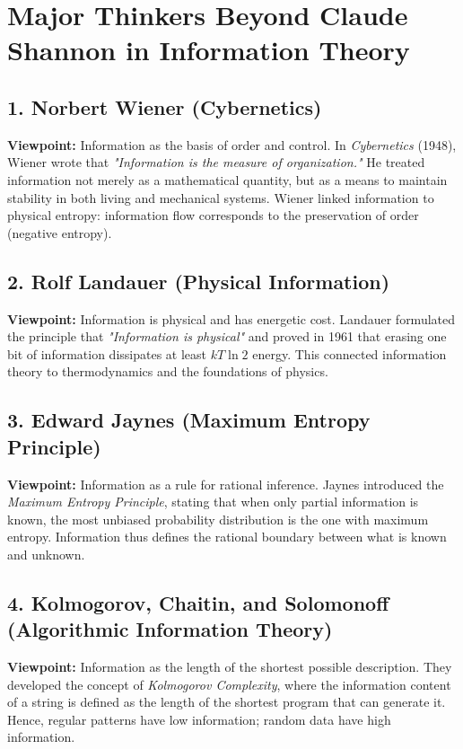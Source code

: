 \section*{Major Thinkers Beyond Claude Shannon in Information Theory}
    
    \subsection*{1. Norbert Wiener (Cybernetics)}
        \textbf{Viewpoint:} Information as the basis of order and control.
        In \textit{Cybernetics} (1948), Wiener wrote that
        \emph{"Information is the measure of organization."}
        He treated information not merely as a mathematical quantity, but as a means to maintain stability in both living and mechanical systems.
        Wiener linked information to physical entropy: information flow corresponds to the preservation of order (negative entropy).
    
    \subsection*{2. Rolf Landauer (Physical Information)}
        \textbf{Viewpoint:} Information is physical and has energetic cost.
        Landauer formulated the principle that \emph{"Information is physical"} and proved in 1961 that erasing one bit of information dissipates at least $kT \ln 2$ energy.
        This connected information theory to thermodynamics and the foundations of physics.
    
    \subsection*{3. Edward Jaynes (Maximum Entropy Principle)}
        \textbf{Viewpoint:} Information as a rule for rational inference.
        Jaynes introduced the \textit{Maximum Entropy Principle}, stating that when only partial information is known,
        the most unbiased probability distribution is the one with maximum entropy.
        Information thus defines the rational boundary between what is known and unknown.
    
    \subsection*{4. Kolmogorov, Chaitin, and Solomonoff (Algorithmic Information Theory)}
        \textbf{Viewpoint:} Information as the length of the shortest possible description.
        They developed the concept of \textit{Kolmogorov Complexity},
        where the information content of a string is defined as the length of the shortest program that can generate it.
        Hence, regular patterns have low information; random data have high information.
    
